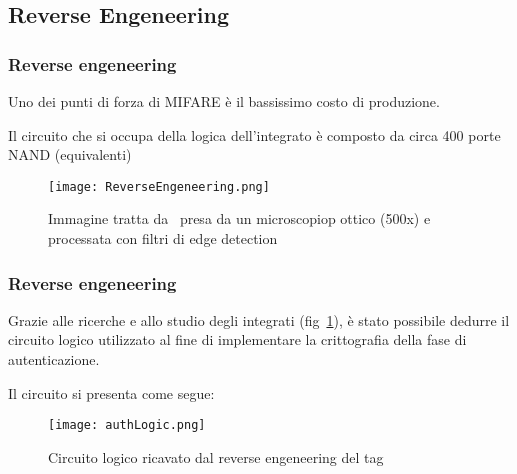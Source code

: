 \subsection{Reverse Engeneering}

\begin{frame}
    \frametitle{Reverse engeneering}
    Uno dei punti di forza di MIFARE è il bassissimo costo di produzione.

    Il circuito che si occupa della logica dell'integrato è composto da circa 400 porte NAND (equivalenti)~\cite{nohl2008reverse}

    \begin{figure}
        \centering
        \texttt{[image: ReverseEngeneering.png]}
        \caption{Immagine tratta da~\cite{nohl2008reverse} presa da un microscopiop ottico (500x) e processata con filtri di edge detection}
        \label{fig:reverse-engeneering}
    \end{figure}
\end{frame}

\begin{frame}
    \frametitle{Reverse engeneering}
    Grazie alle ricerche e allo studio degli integrati (fig~\ref{fig:reverse-engeneering}), è stato possibile dedurre il circuito logico utilizzato
    al fine di implementare la crittografia della fase di autenticazione.

    Il circuito si presenta come segue:
    \begin{figure}
        \centering
        \texttt{[image: authLogic.png]}
        \caption{Circuito logico ricavato dal reverse engeneering del tag}
        \label{fig:reverse-engeneering-circuit}
    \end{figure}
\end{frame}


